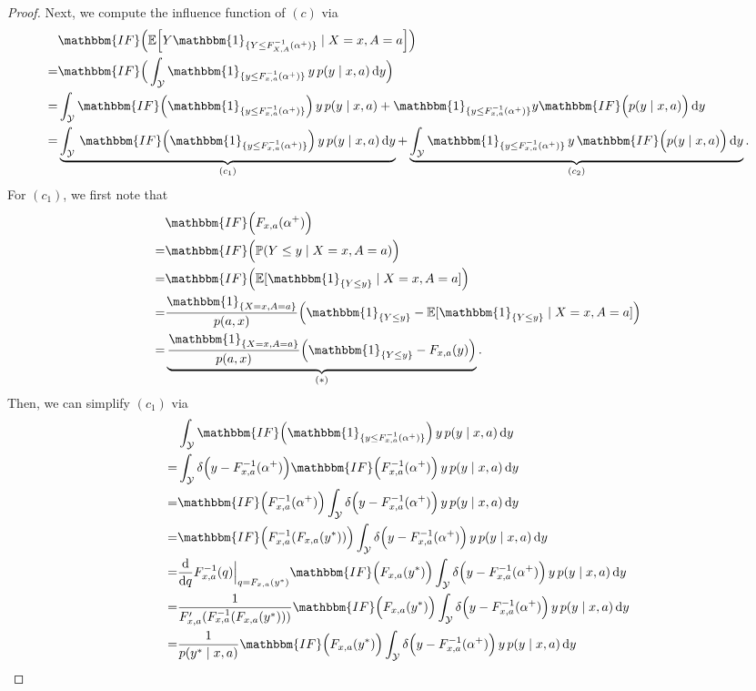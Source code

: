 \documentclass{article} %
\theoremstyle{plain}
\theoremstyle{definition}
\theoremstyle{remark}
\newcommand*\diff{\mathop{}\!\mathrm{d}}
\newcommand{\q}{F_{x,a}^{-1}}
\newcommand{\Q}{F_{X,A}^{-1}}
\newcommand{\indl}{\mathbbm{1}_{\{y\leq \q({\alpha^+})\}}}
\newcommand{\IndL}{\mathbbm{1}_{\{Y\leq \Q({\alpha^+})\}}}
\newcommand{\f}{\mathbbm{IF}}
\begin{document}
\begin{proof}
Next, we compute the influence function of $(c)$ via
\begin{align}
    &\f \Big( \mathbb{E}\Big[Y \IndL \mid X=x,A=a\Big] \Big)\\
    =& \f \Big( \int_\mathcal{Y}  \indl \, y \, p(y\mid x, a) \diff y \Big) \\
    =& \int_\mathcal{Y}  \f\Big(\indl \Big) \, y \, p(y\mid x,a) + \indl y \f \Big(  p(y\mid x,a)\Big) \diff y\\
    =& \underbrace{\int_\mathcal{Y}  \, \f\Big(\indl \Big) \, y \, p(y\mid x,a) \diff y}_{(c_1)} + \underbrace{\int_\mathcal{Y} \indl \, y \, \f \Big( p(y\mid x,a)\Big) \diff y}_{(c_2)}.
\end{align}
For $(c_1)$, we first note that
\begin{align}
    &\f\Big(F_{x,a}({\alpha^+})\Big)\\
    =& \f \Big( \mathbb{P}(Y\leq y \mid X=x,A=a)\Big)\\
    =& \f \Big( \mathbb{E}[\mathbbm{1}_{\{Y\leq y\}}\mid X=x,A=a]\Big)\\
    =& \frac{\mathbbm{1}_{\{X=x,A=a\}}}{p(a,x)}\Big(\mathbbm{1}_{\{Y\leq y\}} - \mathbb{E}[\mathbbm{1}_{\{Y\leq y\}}\mid X=x,A=a]\Big)\\
    =& \underbrace{\frac{\mathbbm{1}_{\{X=x,A=a\}}}{p(a,x)}\Big(\mathbbm{1}_{\{Y\leq y\}} - F_{x,a}(y)\Big)}_{(*)}.
\end{align}
Then, we can simplify $(c_1)$ via
\begin{align}
    &\int_\mathcal{Y}  \f\Big(\indl \Big)\,y\,  p(y\mid x,a) \diff y\\
    =& \int_\mathcal{Y} \delta\Big(y-\q({\alpha^+})\Big)\f\Big(\q({\alpha^+})\Big)\,y\, p(y\mid x,a)\diff y\\
    =& \f\Big(\q({\alpha^+})\Big)\int_\mathcal{Y} \delta\Big(y-\q({\alpha^+})\Big)\,y\,p(y\mid x,a)\diff y\\
    =&  \f\Big(\q(F_{x,a}(y^*))\Big) \int_\mathcal{Y} \delta\Big(y-\q({\alpha^+})\Big) \,y \, p(y\mid x,a)\diff y\\
    =&  \frac{\diff}{\diff q}\q(q)\Big|_{q=F_{x,a}(y^*)} \f\Big(F_{x,a}(y^*)\Big)  \int_\mathcal{Y} \delta \Big( y-\q({\alpha^+})\Big) \, y \, p(y\mid x,a)\diff y \\
    =&   \frac{1}{F_{x,a}'(\q(F_{x,a}(y^*)))}  \f\Big(F_{x,a}(y^*)\Big)   \int_\mathcal{Y} \delta\Big(y-\q({\alpha^+})\Big) \, y \, p(y\mid x,a)\diff y \label{eq:unique_quantile} \\
    =&  \frac{1}{p(y^*\mid x,a)}   \f\Big(F_{x,a}(y^*)\Big)\int_\mathcal{Y} \delta\Big(y-\q({\alpha^+})\Big)   \, y \, p(y\mid x,a)\diff y \label{eq:positive_density}\\

\end{align}
\end{proof}
\end{document}
